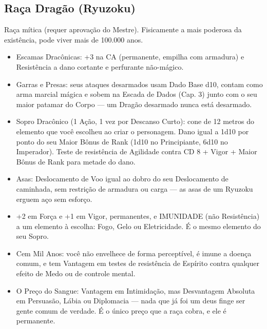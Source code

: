 \subsection{Raça Dragão (Ryuzoku)}
Raça mítica (requer aprovação do Mestre). Fisicamente a mais poderosa da existência, pode viver mais de 100.000 anos.

\begin{itemize}
  \item Escamas Dracônicas: +3 na CA (permanente, empilha com armadura) e Resistência a dano cortante e perfurante não-mágico.
  \item Garras e Presas: seus ataques desarmados usam Dado Base d10, contam como arma marcial mágica e sobem na Escada de Dados (Cap. 3) junto com o seu maior patamar do Corpo --- um Dragão desarmado nunca está desarmado.
  \item Sopro Dracônico (1 Ação, 1 vez por Descanso Curto): cone de 12 metros do elemento que você escolheu ao criar o personagem. Dano igual a 1d10 por ponto do seu Maior Bônus de Rank (1d10 no Principiante, 6d10 no Imperador). Teste de resistência de Agilidade contra CD 8 + Vigor + Maior Bônus de Rank para metade do dano.
  \item Asas: Deslocamento de Voo igual ao dobro do seu Deslocamento de caminhada, sem restrição de armadura ou carga --- as asas de um Ryuzoku erguem aço sem esforço.
  \item +2 em Força e +1 em Vigor, permanentes, e IMUNIDADE (não Resistência) a um elemento à escolha: Fogo, Gelo ou Eletricidade. É o mesmo elemento do seu Sopro.
  \item Cem Mil Anos: você não envelhece de forma perceptível, é imune a doença comum, e tem Vantagem em testes de resistência de Espírito contra qualquer efeito de Medo ou de controle mental.
  \item O Preço do Sangue: Vantagem em Intimidação, mas Desvantagem Absoluta em Persuasão, Lábia ou Diplomacia --- nada que já foi um deus finge ser gente comum de verdade. É o único preço que a raça cobra, e ele é permanente.
\end{itemize}

